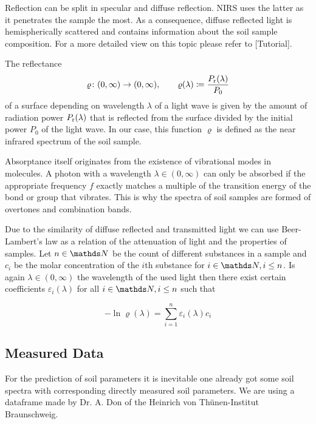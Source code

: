 		Reflection can be split in specular and diffuse reflection.
		NIRS uses the latter as it penetrates the sample the most.
		As a consequence, diffuse reflected light is hemispherically scattered and contains information about the soil sample composition.
		For a more detailed view on this topic please refer to [Tutorial].

		The reflectance 
		\[
			\varrho\colon(0,\infty)\to(0,\infty),\qquad \varrho(\lambda) \coloneqq \frac{P_{\mathrm{r}}(\lambda)}{P_0}
		\]
		of a surface depending on wavelength $\lambda$ of a light wave is given by the amount of radiation power $P_{\mathrm{r}}(\lambda)$ that is reflected from the surface divided by the initial power $P_0$ of the light wave.	
		In our case, this function $\varrho$ is defined as the near infrared spectrum of the soil sample.

		Absorptance itself originates from the existence of vibrational modes in molecules.
		A photon with a wavelength $\lambda \in (0,\infty)$ can only be absorbed if the appropriate frequency $f$ exactly matches a multiple of the transition energy of the bond or group that vibrates.%
		This is why the spectra of soil samples are formed of overtones and combination bands.

		Due to the similarity of diffuse reflected and transmitted light we can use Beer-Lambert's law as a relation of the attenuation of light and the properties of samples.
		Let $n\in\SN$ be the count of different substances in a sample and $c_i$ be the molar concentration of the $i$th substance for $i\in\SN,i\leq n$.
		Is again $\lambda \in (0,\infty)$ the wavelength of the used light then there exist certain coefficients $\varepsilon_i(\lambda)$ for all $i\in\SN,i\leq n$ such that

		\[
			-\ln \varrho(\lambda) = \sum_{i=1}^{n} \varepsilon_i(\lambda) c_i
		\]


	\subsection{Measured Data}
	\label{ssec:measured-data}
	
		For the prediction of soil parameters it is inevitable one already got some soil spectra with corresponding directly measured soil parameters.
		We are using a dataframe made by Dr. A. Don of the Heinrich von Thünen-Institut Braunschweig.

